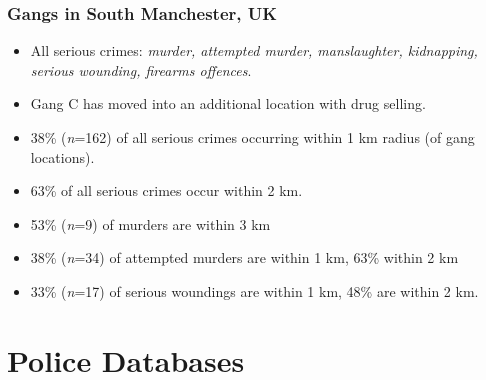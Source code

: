 \documentclass[pdftex]{beamer}
\begin{document}
\begin{frame}
\frametitle{Gangs in South Manchester, UK}
\begin{itemize}
\item All serious crimes: {\emph{murder, attempted murder, manslaughter,
  kidnapping, serious wounding, firearms offences}}. 
\item Gang C has moved into an additional location with drug selling.
\item 38\% ({\emph{n}}=162) of all serious crimes occurring within 1
  km radius (of gang locations).
\item 63\% of all serious crimes occur within 2 km.
\item 53\% ({\emph{n}}=9) of murders are within 3 km
\item 38\% ({\emph{n}}=34) of attempted murders are within 1 km, 63\% within 2 km
\item 33\% ({\emph{n}}=17) of serious woundings are within 1 km, 48\% are within 2 km. 
\end{itemize}
\end{frame}

\section{Police Databases}

{ %
    \begin{frame}[plain]
     \end{frame}
}
\end{document}
